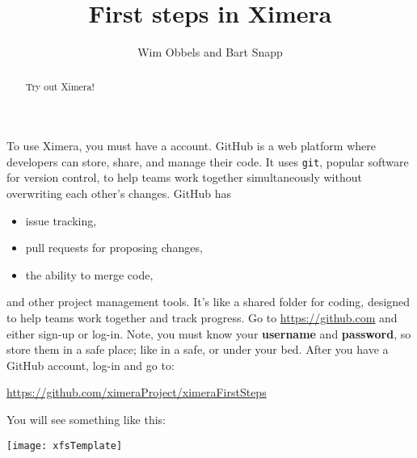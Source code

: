 \documentclass{ximera}
\author{Wim Obbels and Bart Snapp}
\title{First steps in Ximera}
\begin{document}
        \begin{abstract}
            Try out Ximera!
        \end{abstract}
        \maketitle

        To use Ximera, you must have a 
        account. GitHub is a web platform where developers can store, share,
        and manage
        their code. It uses \verb!git!, popular software for version control,
        to help
        teams work together simultaneously without overwriting each other's
        changes.
        GitHub has
        \begin{itemize}
            \item issue tracking,
            \item pull requests for proposing changes,
            \item the ability to merge code,
        \end{itemize}
        and other project management tools. It's like a shared folder for
        coding, designed to
        help teams work together and track progress. Go to
        \url{https://github.com} and
        either sign-up or log-in. Note, you must know your \textbf{username}
        and
        \textbf{password}, so store them in a safe place; like in a safe, or
        under your
        bed. After you have a GitHub account, log-in and go to:
        \begin{center}
            \url{https://github.com/ximeraProject/ximeraFirstSteps}
        \end{center}

        You will see something like this:
        \pdfOnly{\end{multicols}}
\begin{image}
    \texttt{[image: xfsTemplate]}
\end{image}
\newpage
\end{document}
